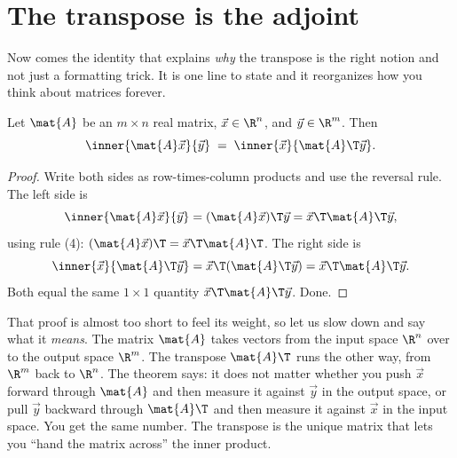 \section{The transpose is the adjoint}

Now comes the identity that explains \emph{why} the transpose is the right notion and not just a
formatting trick. It is one line to state and it reorganizes how you think about matrices forever.

\begin{theorem}\label{ch10:thm-adjoint}
Let $\mat{A}$ be an $m\times n$ real matrix, $\vec{x}\in\R^n$, and $\vec{y}\in\R^m$. Then
\[
  \inner{\mat{A}\vec{x}}{\vec{y}} \;=\; \inner{\vec{x}}{\mat{A}\T\vec{y}}.
\]
\end{theorem}

\begin{proof}
Write both sides as row-times-column products and use the reversal rule. The left side is
\[
  \inner{\mat{A}\vec{x}}{\vec{y}}
  = (\mat{A}\vec{x})\T\vec{y}
  = \vec{x}\T\mat{A}\T\vec{y},
\]
using rule (4): $(\mat{A}\vec{x})\T = \vec{x}\T\mat{A}\T$. The right side is
\[
  \inner{\vec{x}}{\mat{A}\T\vec{y}}
  = \vec{x}\T(\mat{A}\T\vec{y})
  = \vec{x}\T\mat{A}\T\vec{y}.
\]
Both equal the same $1\times 1$ quantity $\vec{x}\T\mat{A}\T\vec{y}$. Done.
\end{proof}

That proof is almost too short to feel its weight, so let us slow down and say what it \emph{means}.
The matrix $\mat{A}$ takes vectors from the input space $\R^n$ over to the output space $\R^m$. The
transpose $\mat{A}\T$ runs the other way, from $\R^m$ back to $\R^n$. The theorem says: it does not
matter whether you push $\vec{x}$ forward through $\mat{A}$ and then measure it against $\vec{y}$ in
the output space, or pull $\vec{y}$ backward through $\mat{A}\T$ and then measure it against $\vec{x}$
in the input space. You get the same number. The transpose is the unique matrix that lets you
``hand the matrix across'' the inner product.

